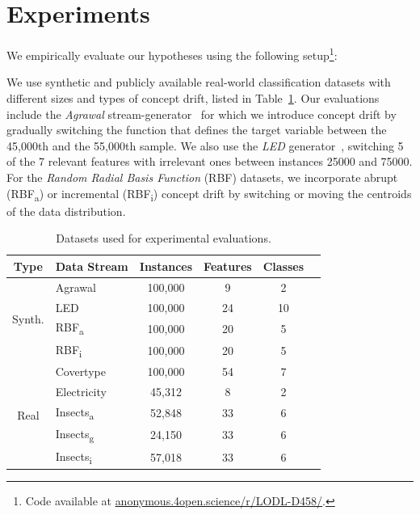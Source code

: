 \documentclass{article} %
\begin{document}
\section{Experiments}\label{sec:experiments}

We empirically evaluate our hypotheses using the following setup\footnote[3]{Code available at \url{anonymous.4open.science/r/LODL-D458/}.}:

We use synthetic and publicly available real-world classification datasets with different sizes and types of concept drift, listed in Table~\ref{tab:datasets}.
Our evaluations include the \textit{Agrawal} stream-generator~\citep{agrawalDatabaseMiningPerformance1993} for which we introduce concept drift by gradually switching the function that defines the target variable between the 45,000th and the 55,000th sample.
We also use the \textit{LED} generator~\citep{gordonClassificationRegressionTrees1984}, switching 5 of the 7 relevant features with irrelevant ones between instances 25000 and 75000.
For the \textit{Random Radial Basis Function} (RBF) datasets, we incorporate abrupt (RBF\textsubscript{a}) or incremental (RBF\textsubscript{i}) concept drift by switching or moving the centroids of the data distribution.

\begin{table}[ht]
   \centering
   \small
   \caption{Datasets used for experimental evaluations.}
   \begin{tabular}{@{}clcccc@{}}
      \toprule
      Type                    & Data Stream              & Instances               & Features & Classes \\
      \midrule
      \multirow{4}{*}{Synth.} & Agrawal                  & 100,000                 & 9        & 2       \\
                              & LED                      & 100,000                 & 24       & 10      \\
                              & RBF\textsubscript{a}     & 100,000                 & 20       & 5       \\
                              & RBF\textsubscript{i}     & 100,000                 & 20       & 5       \\
      \midrule
      \multirow{5}{*}{Real}   & Covertype                & 100,000\footnotemark[4] & 54       & 7       \\
                              & Electricity              & 45,312                  & 8        & 2       \\
                              & Insects\textsubscript{a} & 52,848                  & 33       & 6       \\
                              & Insects\textsubscript{g} & 24,150                  & 33       & 6       \\
                              & Insects\textsubscript{i} & 57,018                  & 33       & 6       \\
      \bottomrule
   \end{tabular}
   \label{tab:datasets}
\end{table}
\end{document}
